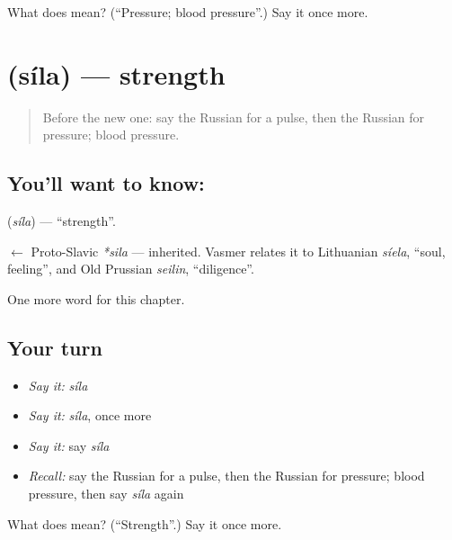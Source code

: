 \begin{tcolorbox}[breakable,colback=teal!4,colframe=teal!35!black,title={Before you move on}]
What does  mean? (\textquotedblleft{}Pressure; blood pressure\textquotedblright{}.) Say it once more.
\end{tcolorbox}
\section[\texorpdfstring{\ru{сила} (síla)}{сила (síla)}]{ (síla) — strength}

\label{lesson:RU-C211-sila}



\begin{quote}
Before the new one: say the Russian for a pulse, then the Russian for pressure; blood pressure.
\end{quote}

\subsection*{You'll want to know: }
\textbf{} (\emph{síla}) — \textquotedblleft{}strength\textquotedblright{}.

\begin{cousinweb}
\textbf{} $\leftarrow$ Proto-Slavic \emph{*sila} — inherited. Vasmer relates it to Lithuanian \emph{síela}, \textquotedblleft{}soul, feeling\textquotedblright{}, and Old Prussian \emph{seilin}, \textquotedblleft{}diligence\textquotedblright{}.
\end{cousinweb}

\begin{grammarlens}[title={What you've built}]
One more word for this chapter.
\end{grammarlens}

\subsection*{Your turn}
\begin{itemize}
\raggedright
  \item \emph{Say it:} \emph{síla}
  \item \emph{Say it:} \emph{síla}, once more
  \item \emph{Say it:} say \emph{síla}
  \item \emph{Recall:} say the Russian for a pulse, then the Russian for pressure; blood pressure, then say \emph{síla} again
\end{itemize}

\begin{tcolorbox}[breakable,colback=teal!4,colframe=teal!35!black,title={Before you move on}]
What does  mean? (\textquotedblleft{}Strength\textquotedblright{}.) Say it once more.
\end{tcolorbox}
